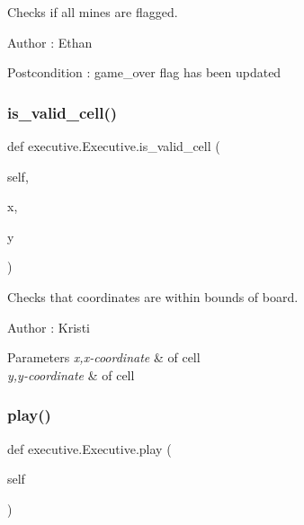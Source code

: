 Checks if all mines are flagged. 

\begin{DoxyAuthor}{Author}
\+: Ethan 
\end{DoxyAuthor}
\begin{DoxyPostcond}{Postcondition}
\+: game\+\_\+over flag has been updated 
\end{DoxyPostcond}
\mbox{\label{classexecutive_1_1_executive_aa44d8e9965ea2e73d9e22c81208b8819}} 
\subsubsection{\texorpdfstring{is\+\_\+valid\+\_\+cell()}{is\_valid\_cell()}}
{\footnotesize\ttfamily def executive.\+Executive.\+is\+\_\+valid\+\_\+cell (\begin{DoxyParamCaption}\item[{}]{self,  }\item[{}]{x,  }\item[{}]{y }\end{DoxyParamCaption})}



Checks that coordinates are within bounds of board. 

\begin{DoxyAuthor}{Author}
\+: Kristi 
\end{DoxyAuthor}

\begin{DoxyParams}{Parameters}
{\em x,x-\/coordinate} & of cell \\
\hline
{\em y,y-\/coordinate} & of cell \\
\hline
\end{DoxyParams}
\mbox{\label{classexecutive_1_1_executive_a127200710d2bdb34a902c703928ab93a}} 
\subsubsection{\texorpdfstring{play()}{play()}}
{\footnotesize\ttfamily def executive.\+Executive.\+play (\begin{DoxyParamCaption}\item[{}]{self }\end{DoxyParamCaption})}



